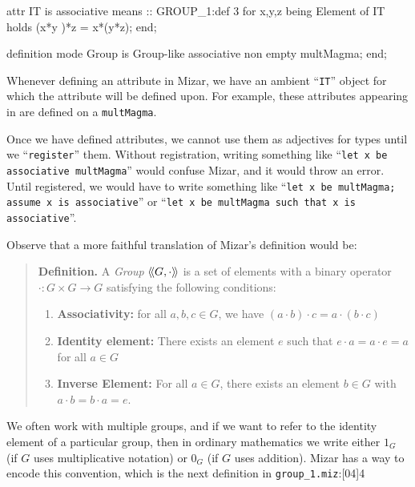 {\begin{mizar}
  attr IT is associative means
:: GROUP_1:def 3
  for x,y,z being Element of IT holds (x*y )*z = x*(y*z);
end;

definition
  mode Group is Group-like associative non empty multMagma;
end;
\end{mizar}

\begin{idiom}\label{rmk:introduction:idiom-it-in-attributes}
Whenever defining an attribute in Mizar, we have an ambient
``\verb#IT#'' object for which the attribute will be defined upon. For
example, these attributes appearing in  are defined
on a \verb#multMagma#.
\end{idiom}

\begin{aside}
Once we have defined attributes, we cannot use them as adjectives for
types until we ``\verb#register#'' them. Without registration, writing
something like ``\texttt{let x be associative multMagma}'' would confuse
Mizar, and it would throw an error. Until registered, we would have to
write something like ``\texttt{let x be multMagma; assume x is associative}''
or ``\texttt{let x be multMagma such that x is associative}''.
\end{aside}

Observe that a more faithful translation of Mizar's definition would
be:

\begin{quote}
  \textbf{Definition.} A \emph{Group} $\struct{G,\cdot}$ is a set of
  elements with a binary operator $\cdot\colon G\times G\to G$
  satisfying the following conditions:
  \begin{enumerate}
  \item \textbf{Associativity:} for all $a,b,c\in G$, we have $(a\cdot b)\cdot c = a\cdot(b\cdot c)$
  \item \textbf{Identity element:} There exists an element $e$ such that
    $e\cdot a= a\cdot e = a$ for all $a\in G$
  \item \textbf{Inverse Element:} For all $a\in G$, there exists an
    element $b\in G$ with $a\cdot b=b\cdot a = e$.
  \end{enumerate}
\end{quote}

We often work with multiple groups, and if we want to refer to the
identity element of a particular group, then in ordinary mathematics we
write either $1_{G}$ (if $G$ uses multiplicative notation) or $0_{G}$
(if $G$ uses addition). Mizar has a way to encode this convention, which
is the next definition in
\texttt{group\_1.miz}:[04]{4}

}
